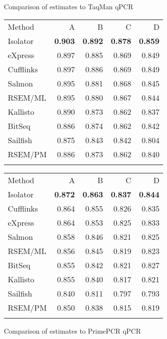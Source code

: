 \documentclass{article}
\begin{document}
\begin{figure*}
\begin{subtable}{0.5\linewidth}
\caption{Comparison of estimates to TaqMan qPCR}
\begin{tabular}[c]{@{}lrrrr@{}}
\toprule\addlinespace
Method & A & B & C & D
\\\addlinespace
\midrule
Isolator & \textbf{0.903} & \textbf{0.892} & \textbf{0.878} & \textbf{0.859}
\\\addlinespace
eXpress & 0.897 & 0.885 & 0.869 & 0.849
\\\addlinespace
Cufflinks & 0.897 & 0.886 & 0.869 & 0.849
\\\addlinespace
Salmon  &  0.895 & 0.881 & 0.868 & 0.845
\\\addlinespace
RSEM/ML  & 0.895 & 0.880 & 0.867 & 0.844
\\\addlinespace
Kallisto &  0.890 & 0.873 & 0.862 & 0.837
\\\addlinespace
BitSeq  &  0.886 & 0.874 & 0.862 & 0.842
\\\addlinespace
Sailfish &  0.875 & 0.843 & 0.842 & 0.804
\\\addlinespace
RSEM/PM  & 0.886 & 0.873 & 0.862 & 0.840
\\\addlinespace
\bottomrule
\addlinespace
\end{tabular}
\label{table:taqman:spearman}
\end{subtable}
\begin{subtable}{0.5\linewidth}
\caption{Comparison of estimates to PrimePCR qPCR}
\begin{tabular}[c]{@{}lrrrr@{}}
\toprule\addlinespace
Method & A & B & C & D
\\\addlinespace
\midrule
Isolator  & \textbf{0.872} & \textbf{0.863} & \textbf{0.837} & \textbf{0.844}
\\\addlinespace
Cufflinks & 0.864 & 0.855 & 0.826 & 0.835
\\\addlinespace
eXpress   & 0.864 & 0.853 & 0.825 & 0.833
\\\addlinespace
Salmon    & 0.858 & 0.846 & 0.821 & 0.825
\\\addlinespace
RSEM/ML   & 0.856 & 0.845 & 0.819 & 0.823
\\\addlinespace
BitSeq    & 0.855 & 0.842 & 0.821 & 0.827
\\\addlinespace
Kallisto  & 0.855 & 0.840 & 0.817 & 0.821
\\\addlinespace
Sailfish  & 0.840 & 0.811 & 0.797 & 0.793
\\\addlinespace
RSEM/PM   & 0.850 & 0.838 & 0.815 & 0.819
\\\addlinespace
\bottomrule
\addlinespace
\end{tabular}
\label{table:primepcr:spearman}
\end{subtable}


\end{figure*}
\end{document}
